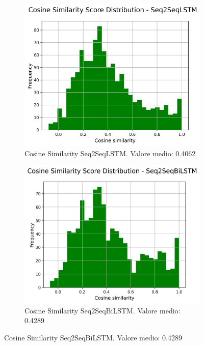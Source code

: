 \documentclass[a4paper, 12pt]{article}
\begin{document}
\begin{figure}[H]
    \centering
    \begin{subfigure}{0.45\textwidth}
        \centering
        \includegraphics[width=\textwidth]{media/Seq2SeqLSTM_cosine_similarity_scores.png}
        \caption{Cosine Similarity Seq2SeqLSTM. Valore medio: 0.4062}
    \end{subfigure}
    \hfill
    \begin{subfigure}{0.45\textwidth}
        \centering
        \includegraphics[width=\textwidth]{media/Seq2SeqBiLSTM_cosine_similarity_scores.png}
        \caption{Cosine Similarity Seq2SeqBiLSTM. Valore medio: 0.4289}

\end{subfigure}
\end{figure}
\end{document}
